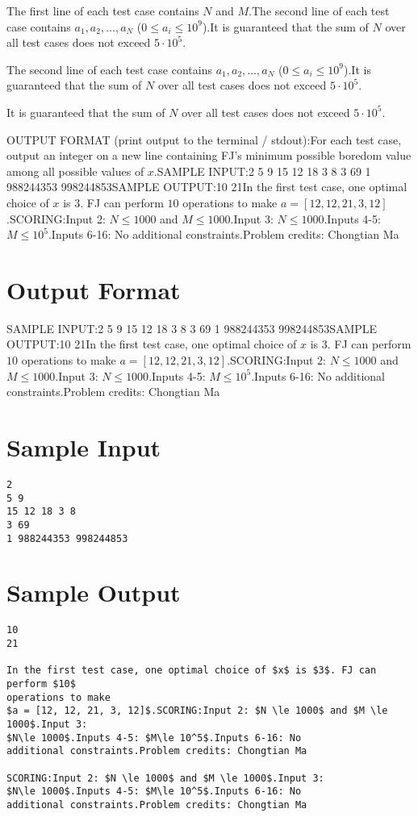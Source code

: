 \documentclass[12pt]{article}
\begin{document}
The first line of each test case contains $N$ and $M$.The second line of each test case contains $a_1, a_2, ..., a_N$
($0 \leq a_i \leq 10^9$).It is guaranteed that the sum of $N$ over all test cases does not exceed
$5 \cdot 10^5$.

The second line of each test case contains $a_1, a_2, ..., a_N$
($0 \leq a_i \leq 10^9$).It is guaranteed that the sum of $N$ over all test cases does not exceed
$5 \cdot 10^5$.

It is guaranteed that the sum of $N$ over all test cases does not exceed
$5 \cdot 10^5$.

OUTPUT FORMAT (print output to the terminal / stdout):For each test case, output an integer on a new line containing FJ's minimum
possible boredom value among all possible values of $x$.SAMPLE INPUT:2
5 9
15 12 18 3 8
3 69
1 988244353 998244853SAMPLE OUTPUT:10
21In the first test case, one optimal choice of $x$ is $3$. FJ can perform $10$
operations to make
$a = [12, 12, 21, 3, 12]$.SCORING:Input 2: $N \le 1000$ and $M \le 1000$.Input 3:
$N\le 1000$.Inputs 4-5: $M\le 10^5$.Inputs 6-16: No
additional constraints.Problem credits: Chongtian Ma

\section*{Output Format}
SAMPLE INPUT:2
5 9
15 12 18 3 8
3 69
1 988244353 998244853SAMPLE OUTPUT:10
21In the first test case, one optimal choice of $x$ is $3$. FJ can perform $10$
operations to make
$a = [12, 12, 21, 3, 12]$.SCORING:Input 2: $N \le 1000$ and $M \le 1000$.Input 3:
$N\le 1000$.Inputs 4-5: $M\le 10^5$.Inputs 6-16: No
additional constraints.Problem credits: Chongtian Ma

\section*{Sample Input}
\begin{verbatim}
2
5 9
15 12 18 3 8
3 69
1 988244353 998244853
\end{verbatim}

\section*{Sample Output}
\begin{verbatim}
10
21

In the first test case, one optimal choice of $x$ is $3$. FJ can perform $10$
operations to make
$a = [12, 12, 21, 3, 12]$.SCORING:Input 2: $N \le 1000$ and $M \le 1000$.Input 3:
$N\le 1000$.Inputs 4-5: $M\le 10^5$.Inputs 6-16: No
additional constraints.Problem credits: Chongtian Ma

SCORING:Input 2: $N \le 1000$ and $M \le 1000$.Input 3:
$N\le 1000$.Inputs 4-5: $M\le 10^5$.Inputs 6-16: No
additional constraints.Problem credits: Chongtian Ma
\end{verbatim}
\end{document}
